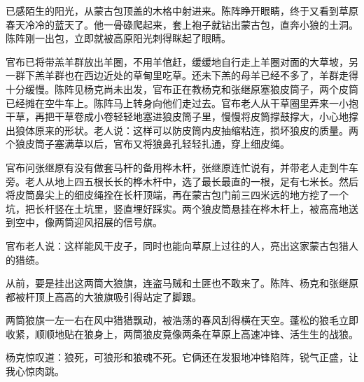 \par 已感陌生的阳光，从蒙古包顶盖的木格中射进来。陈阵睁开眼睛，终于又看到草原春天冷冷的蓝天了。他一骨碌爬起来，套上袍子就钻出蒙古包，直奔小狼的土洞。陈阵刚一出包，立即就被高原阳光刺得眯起了眼睛。
\par 官布已将带羔羊群放出羊圈，不用羊倌赶，缓缓地自行走上羊圈对面的大草坡，另一群下羔羊群也在西边近处的草甸里吃草。还未下羔的母羊已经不多了，羊群走得十分缓慢。陈阵见杨克尚未出发，官布正在教杨克和张继原塞狼皮筒子，两个皮筒已经摊在空牛车上。陈阵马上转身向他们走过去。官布老人从干草圈里弄来一小抱干草，再把干草卷成小卷轻轻地塞进狼皮筒子里，慢慢将皮筒撑鼓撑大，小心地撑出狼体原来的形状。老人说：这样可以防皮筒内皮抽缩粘连，损坏狼皮的质量。两个狼皮筒子塞满草以后，官布又将狼鼻孔轻轻扎通，穿上细皮绳。
\par 官布问张继原有没有做套马杆的备用桦木杆，张继原连忙说有，并带老人走到牛车旁。老人从地上四五根长长的桦木杆中，选了最长最直的一根，足有七米长。然后将皮筒鼻尖上的细皮绳拴在长杆顶端，再在蒙古包门前三四米远的地方挖了一个坑，把长杆竖在土坑里，竖直埋好踩实。两个狼皮筒悬挂在桦木杆上，被高高地送到空中，像两筒迎风招展的信号旗。
\par 官布老人说：这样能风干皮子，同时也能向草原上过往的人，亮出这家蒙古包猎人的猎绩。
\par 从前，要是挂出这两筒大狼旗，连盗马贼和土匪也不敢来了。陈阵、杨克和张继原都被杆顶上高高的大狼旗吸引得站定了脚跟。
\par 两筒狼旗一左一右在风中猎猎飘动，被浩荡的春风刮得横在天空。蓬松的狼毛立即收紧，顺顺地贴在狼身上，两筒狼皮竟像两条在草原上高速冲锋、活生生的战狼。
\par 杨克惊叹道：狼死，可狼形和狼魂不死。它俩还在发狠地冲锋陷阵，锐气正盛，让我心惊肉跳。
